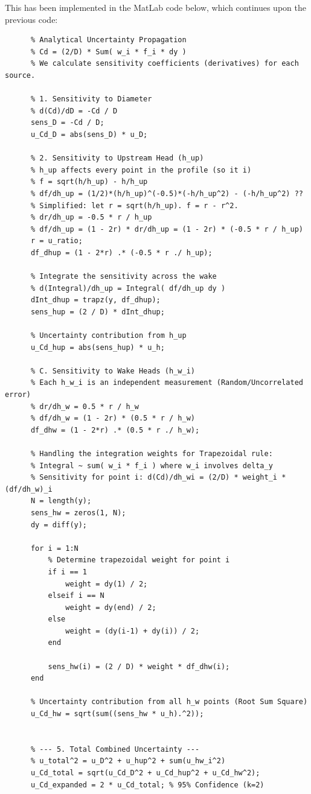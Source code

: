 \begin{derivation}
    This has been implemented in the MatLab code below, which continues upon the previous code:
    \begin{verbatim}
      % Analytical Uncertainty Propagation
      % Cd = (2/D) * Sum( w_i * f_i * dy )
      % We calculate sensitivity coefficients (derivatives) for each source.

      % 1. Sensitivity to Diameter
      % d(Cd)/dD = -Cd / D
      sens_D = -Cd / D;
      u_Cd_D = abs(sens_D) * u_D;

      % 2. Sensitivity to Upstream Head (h_up)
      % h_up affects every point in the profile (so it i)
      % f = sqrt(h/h_up) - h/h_up
      % df/dh_up = (1/2)*(h/h_up)^(-0.5)*(-h/h_up^2) - (-h/h_up^2) ??
      % Simplified: let r = sqrt(h/h_up). f = r - r^2.
      % dr/dh_up = -0.5 * r / h_up
      % df/dh_up = (1 - 2r) * dr/dh_up = (1 - 2r) * (-0.5 * r / h_up)
      r = u_ratio;
      df_dhup = (1 - 2*r) .* (-0.5 * r ./ h_up);

      % Integrate the sensitivity across the wake
      % d(Integral)/dh_up = Integral( df/dh_up dy )
      dInt_dhup = trapz(y, df_dhup);
      sens_hup = (2 / D) * dInt_dhup;

      % Uncertainty contribution from h_up
      u_Cd_hup = abs(sens_hup) * u_h;

      % C. Sensitivity to Wake Heads (h_w_i)
      % Each h_w_i is an independent measurement (Random/Uncorrelated error)
      % dr/dh_w = 0.5 * r / h_w
      % df/dh_w = (1 - 2r) * (0.5 * r / h_w)
      df_dhw = (1 - 2*r) .* (0.5 * r ./ h_w);

      % Handling the integration weights for Trapezoidal rule:
      % Integral ~ sum( w_i * f_i ) where w_i involves delta_y
      % Sensitivity for point i: d(Cd)/dh_wi = (2/D) * weight_i * (df/dh_w)_i
      N = length(y);
      sens_hw = zeros(1, N);
      dy = diff(y);

      for i = 1:N
          % Determine trapezoidal weight for point i
          if i == 1
              weight = dy(1) / 2;
          elseif i == N
              weight = dy(end) / 2;
          else
              weight = (dy(i-1) + dy(i)) / 2;
          end
          
          sens_hw(i) = (2 / D) * weight * df_dhw(i);
      end

      % Uncertainty contribution from all h_w points (Root Sum Square)
      u_Cd_hw = sqrt(sum((sens_hw * u_h).^2));


      % --- 5. Total Combined Uncertainty ---
      % u_total^2 = u_D^2 + u_hup^2 + sum(u_hw_i^2)
      u_Cd_total = sqrt(u_Cd_D^2 + u_Cd_hup^2 + u_Cd_hw^2);
      u_Cd_expanded = 2 * u_Cd_total; % 95% Confidence (k=2)


\end{verbatim}
\end{derivation}
